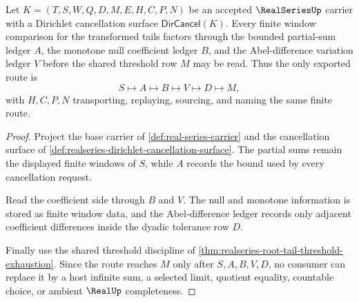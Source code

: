 \begin{theorem}
\label{thm:realseries-dirichlet-partial-sum-bounded-variation}
Let $K=(T,S,W,Q,D,M,E,H,C,P,N)$ be an accepted $\RealSeriesUp$ carrier with a Dirichlet cancellation surface $\mathsf{DirCancel}(K)$. Every finite window comparison for the transformed tails factors through the bounded partial-sum ledger $A$, the monotone null coefficient ledger $B$, and the Abel-difference variation ledger $V$ before the shared threshold row $M$ may be read. Thus the only exported route is
$$
S \longmapsto A \longmapsto B \longmapsto V \longmapsto D \longmapsto M ,
$$
with $H,C,P,N$ transporting, replaying, sourcing, and naming the same finite route.
\end{theorem}
\begin{proof}
Project the base carrier of \autoref{def:real-series-carrier} and the cancellation surface of \autoref{def:realseries-dirichlet-cancellation-surface}. The partial sums remain the displayed finite windows of $S$, while $A$ records the bound used by every cancellation request.

Read the coefficient side through $B$ and $V$. The null and monotone information is stored as finite window data, and the Abel-difference ledger records only adjacent coefficient differences inside the dyadic tolerance row $D$.

Finally use the shared threshold discipline of \autoref{thm:realseries-root-tail-threshold-exhaustion}. Since the route reaches $M$ only after $S,A,B,V,D$, no consumer can replace it by a host infinite sum, a selected limit, quotient equality, countable choice, or ambient $\RealUp$ completeness.
\end{proof}

